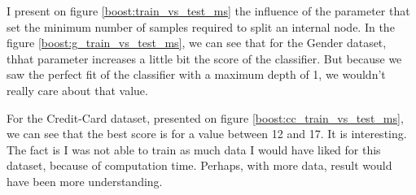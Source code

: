 \documentclass[10pt]{article}
\begin{document}
			I present on figure \ref{boost:train_vs_test_ms} the influence of the parameter that set the minimum number of samples required to split an internal node.
			In the figure \ref{boost:g_train_vs_test_ms}, we can see that for the Gender dataset, thhat parameter increases a little bit the score of the classifier. But because we saw the perfect fit of the classifier with a maximum depth of 1, we wouldn't really care about that value.

			For the Credit-Card dataset, presented on figure \ref{boost:cc_train_vs_test_ms}, we can see that the best score is for a value between 12 and 17. It is interesting. The fact is I was not able to train as much data I would have liked for this dataset, because of computation time. Perhaps, with more data, result would have been more understanding.
\end{document}
